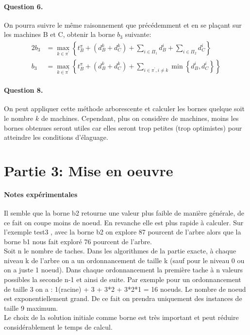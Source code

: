 \documentclass[a4paper, 10pt]{article}
\begin{document}
		\paragraph{Question 6.}{On pourra suivre le même raisonnement que précédemment et en se plaçant sur les machines B et C, obtenir la borne $b_3$ suivante:
		\begin{alignat*}{2}
			b_3 &= \max_{k \in \pi^\prime} \left\{ t^{\pi}_B + \left( d^k_B + d^k_C \right) + \sum_{i \in \Pi_1} d^i_B + \sum_{i \in \Pi_2} d^i_C \right\} \\
			b_3 &= \max_{k \in \pi^\prime} \left\{ t^{\pi}_B + \left( d^k_B + d^k_C \right) + \sum_{i \in \pi^\prime, i \ne k} \min \left\{ d^i_B, d^i_C \right\} \right\}
		\end{alignat*}
		}
		
		\paragraph{Question 8.}{On peut appliquer cette méthode arborescente et calculer les bornes quelque soit le nombre $k$ de machines. Cependant, plus on considère de machines, moins les bornes obtenues seront utiles car elles seront trop petites (trop optimistes) pour atteindre les conditions d'élaguage. 		
		}
		
	        \section*{Partie 3: Mise en oeuvre}
		\paragraph{Notes expérimentales}{Il semble que la borne b2 retourne une valeur plus faible de manière générale, de ce fait on coupe moins de noeud. En revanche elle est plus rapide à calculer. Sur l'exemple test3 , avec la borne b2 on explore 87 pourcent de l'arbre alors que la borne b1 nous fait exploré 76 pourcent de l'arbre. \\
                  Soit n le nombre de taches.
                  Dans les algorithmes de la partie exacte, à chaque niveau k de l'arbre on a un ordonnancement de taille k (sauf pour le niveau 0 ou on a juste 1 noeud). Dans chaque ordonnancement la première tache à n valeurs possibles la seconde n-1 et ainsi de suite. Par exemple pour un ordonnancement de taille 3 on a : 1(racine) + 3 + 3*2 + 3*2*1 = 16 noeuds. Le nombre de noeud est exponentiellement grand. De ce fait on prendra uniquement des instances de taille 9 maximum. \\
                  Le choix de la solution initiale comme borne est très important et peut réduire considérablement le temps de calcul.
                }
\end{document}
